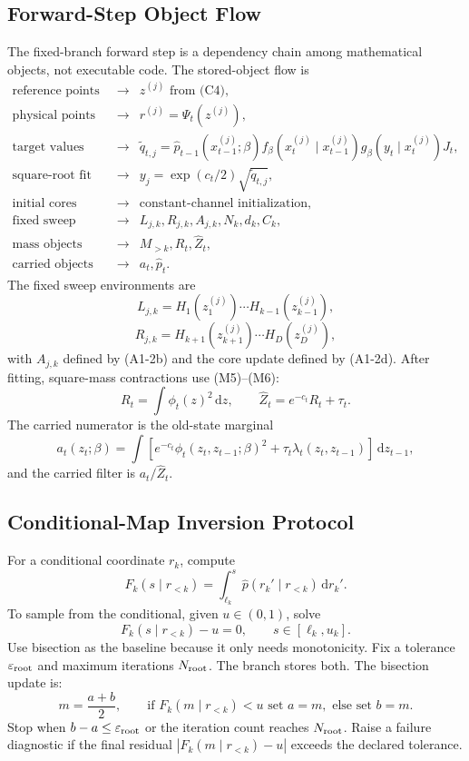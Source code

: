 \documentclass[11pt]{article}
\newcommand{\dd}{\,\mathrm d}
\begin{document}
\subsection{Forward-Step Object Flow}

The fixed-branch forward step is a dependency chain among mathematical
objects, not executable code.  The stored-object flow is
\[
\begin{array}{rcl}
\text{reference points} &\longrightarrow& z^{(j)} \text{ from (C4)},\\
\text{physical points} &\longrightarrow& r^{(j)}=\Psi_t(z^{(j)}),\\
\text{target values} &\longrightarrow&
    \widetilde q_{t,j}
    =
    \widehat p_{t-1}(x_{t-1}^{(j)};\beta)
    f_\beta(x_t^{(j)}\mid x_{t-1}^{(j)})
    g_\beta(y_t\mid x_t^{(j)})J_t,\\
\text{square-root fit values} &\longrightarrow&
    y_j=\exp(c_t/2)\sqrt{\widetilde q_{t,j}},\\
\text{initial cores} &\longrightarrow&
    \text{constant-channel initialization},\\
\text{fixed sweep objects} &\longrightarrow&
    L_{j,k},R_{j,k},A_{j,k},N_k,d_k,C_k,\\
\text{mass objects} &\longrightarrow&
    M_{>k},R_t,\widehat Z_t,\\
\text{carried objects} &\longrightarrow&
    a_t,\widehat p_t.
\end{array}
\tag{C12}
\]
The fixed sweep environments are
\[
    L_{j,k}=H_1(z_1^{(j)})\cdots H_{k-1}(z_{k-1}^{(j)}),
\]
\[
    R_{j,k}=H_{k+1}(z_{k+1}^{(j)})\cdots H_D(z_D^{(j)}),
\]
with \(A_{j,k}\) defined by (A1-2b) and the core update defined by (A1-2d).
After fitting, square-mass contractions use (M5)--(M6):
\[
    R_t=\int\phi_t(z)^2\dd z,\qquad
    \widehat Z_t=e^{-c_t}R_t+\tau_t.
\]
The carried numerator is the old-state marginal
\[
    a_t(z_t;\beta)
    =
    \int
    \left[e^{-c_t}\phi_t(z_t,z_{t-1};\beta)^2
    +\tau_t\lambda_t(z_t,z_{t-1})\right]\dd z_{t-1},
\]
and the carried filter is \(a_t/\widehat Z_t\).

\subsection{Conditional-Map Inversion Protocol}

For a conditional coordinate \(r_k\), compute
\[
    F_k(s\mid r_{<k})
    =
    \int_{\ell_k}^{s}\widehat p(r_k'\mid r_{<k})\dd r_k'.
\]
To sample from the conditional, given \(u\in(0,1)\), solve
\[
    F_k(s\mid r_{<k})-u=0,\qquad s\in[\ell_k,u_k].
\]
Use bisection as the baseline because it only needs monotonicity.  Fix a
tolerance \(\varepsilon_{\rm root}\) and maximum iterations \(N_{\rm root}\).
The branch stores both.  The bisection update is:
\[
    m=\frac{a+b}{2},\qquad
    \text{if }F_k(m\mid r_{<k})<u\text{ set }a=m,\text{ else set }b=m.
\]
Stop when \(b-a\le\varepsilon_{\rm root}\) or the iteration count reaches
\(N_{\rm root}\).  Raise a failure diagnostic if the final residual
\(|F_k(m\mid r_{<k})-u|\) exceeds the declared tolerance.
\end{document}
